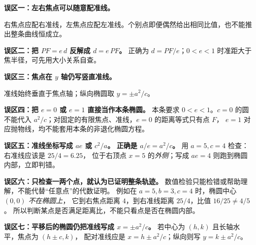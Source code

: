 \begin{trapbox}
\textbf{误区一：左右焦点可以随意配准线。}

右焦点应配右准线，左焦点应配左准线。个别点即便偶然给出相同比值，也不能推出整条曲线恒成立。

\textbf{误区二：把 $PF=e\,d$ 反解成 $d=e\,PF$。}
正确为 $d=PF/e$；$0<e<1$ 时准距大于焦半径，可先用大小关系自查。
\end{trapbox}
\clearpage
\begin{trapbox}
\textbf{误区三：焦点在 $y$ 轴仍写竖直准线。}

准线始终垂直于焦点轴；纵向椭圆取 $y=\pm a^2/c$。

\textbf{误区四：把 $e=0$ 或 $e=1$ 直接当作本条椭圆。}
本条要求 $0<e<1$。$c=0$ 的圆不能代入 $a^2/c$；对固定的有限焦点、准线，$e=0$ 的距离等式只有点 $F$，
$e=1$ 对应抛物线，均不能套用本条的非退化椭圆方程。
\end{trapbox}

\begin{trapbox}
\textbf{误区五：准线坐标写成 $ae$ 或 $c^2/a$。}
\textbf{正确是 $a/e=a^2/c$。} 用 $a=5,c=4$ 检查：右准线应该是 $25/4=6.25$，
位于右顶点 $x=5$ 的\emph{外侧}；写成 $ae=4$ 则跑到椭圆内部，立即判错。

\medskip
\textbf{误区六：只检查一两个点，就认为已证明整条轨迹。}
数值检验只能检错或帮助理解，不能代替“任意点”的代数证明。
例如在 $a=5,b=3,c=4$ 时，椭圆中心 $(0,0)$ \emph{不在椭圆上}，
它到右焦点距离 $4$，到右准线距离 $25/4$，比值 $16/25\ne4/5$。
所以判断某点是否满足距离比，不能只看点是否在椭圆内部。

\medskip
\textbf{误区七：平移后的椭圆仍把准线写成 $x=\pm a^2/c$。}
若中心为 $(h,k)$ 且长轴水平，焦点为 $(h\pm c,k)$，
配对准线应是 $x=h\pm a^2/c$；纵向则写 $y=k\pm a^2/c$。
\end{trapbox}

